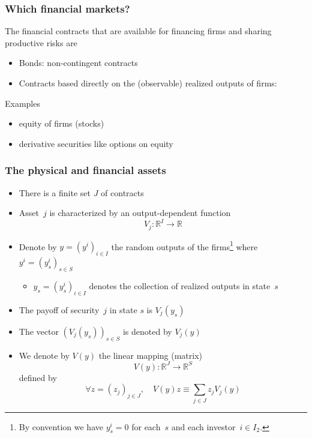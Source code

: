 \documentclass[blue]{beamer}
\def\R{\mathbb{R}}
\theoremstyle{definition}
\theoremstyle{example}
\begin{document}

\begin{frame}\frametitle{Which financial markets?}

The financial contracts that are available for financing firms and sharing productive risks are
\begin{itemize}
\item Bonds: non-contingent contracts
\item Contracts based directly on the (observable) realized outputs of firms:
\end{itemize}

\begin{block}{Examples}
\begin{itemize}
\item equity of firms (stocks)
\item derivative securities like options on equity
\end{itemize}
\end{block}

\end{frame}


\begin{frame}\frametitle{The physical and financial assets}

\begin{itemize}
\item There is a finite set $J$ of contracts
\item Asset~$j$ is characterized by an output-dependent function
\[
V_j : \R^I \to \R
\]
\item Denote by $y=(y^i)_{i\in I}$ the random outputs of the firms\footnote{By convention we have $y^i_s=0$ for each~$s$ and each investor~$i\in I_2$.} where $y^i=(y^i_s)_{s\in S}$
    \begin{itemize}
    \item $y_s=(y^i_s)_{i\in I}$ denotes the collection of realized outputs in state~$s$
    \end{itemize}
\item The payoff of security~$j$ in state $s$ is $V_j(y_s)$
\item The vector $(V_j(y_s))_{s\in S}$ is denoted by $V_j(y)$
\item We denote by $V(y)$ the linear mapping (matrix)
\[
V(y) : \R^J \to \R^S
\]
defined by
\[
\forall z=(z_j)_{j\in J}, \quad V(y) z \equiv \sum_{j\in J} z_j V_j(y)
\]
\end{itemize}

\end{frame}
\end{document}
